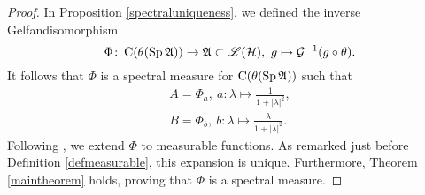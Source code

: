 \begin{proof}
 
 In Proposition \ref{spectraluniqueness}, we defined the inverse Gelfandisomorphism 
 \[
  \Phi \colon \operatorname{C} ( \theta (\operatorname{Sp} \mathfrak{A})) \to \mathfrak{A} \subset \mathscr{L}(\mathcal{H}),~ g \mapsto \mathcal{G} ^{-1}
  (g \circ \theta).
 \]
 It follows that $\Phi$ is a spectral measure for $\operatorname{C}( \theta (\operatorname{Sp} \mathfrak{A})) $ such that
 \begin{align*}
  A = \Phi_a, ~ a\colon \lambda \mapsto \frac{1}{1+ | \lambda| ^2 }, \\
  B = \Phi_b, ~ b\colon \lambda \mapsto \frac{\lambda}{1 + | \lambda | ^2}.
 \end{align*}
 Following \cite[Ch. 4.5]{PedAnaN}, we extend $\Phi$ to measurable functions. 
 As remarked just before Definition \ref{defmeasurable}, this expansion is
 unique. Furthermore, Theorem \ref{maintheorem} holds, proving that
 $\Phi$ is a spectral measure.
 

\end{proof}
